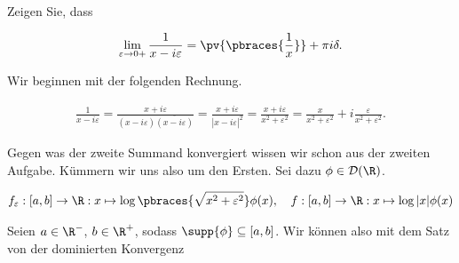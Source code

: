 
\begin{exercise}

Zeigen Sie, dass

\begin{align*}
    \lim_{\varepsilon \to 0+}
    \frac{1}{x - i \varepsilon}
    =
    \pv
    {
        \pbraces
        {
            \frac{1}{x}
        }
    }
    +
    \pi i \delta.
\end{align*}

\end{exercise}


\begin{solution}

Wir beginnen mit der folgenden Rechnung.

\begin{align*}
    \frac{1}{x - i\varepsilon}
    =
    \frac
    {
        x + i \varepsilon
    }{
        (x - i\varepsilon)
        \overline
        {
            (x - i\varepsilon)
        }
    }
    =
    \frac
    {
        x + i \varepsilon
    }{
        |x - i \varepsilon|^2
    }
    =
    \frac{x + i \varepsilon}{x^2 + \varepsilon^2}
    =
    \frac{x}{x^2 + \varepsilon^2} + i\frac{\varepsilon}{x^2 + \varepsilon^2}.
\end{align*}

Gegen was der zweite Summand konvergiert wissen wir schon aus der zweiten Aufgabe.
Kümmern wir uns also um den Ersten.
Sei dazu $\phi \in \mathcal{D}(\R)$.

\begin{align*}
    f_\varepsilon:
    [a,b] \to \R:
    x \mapsto \log\pbraces{\sqrt{x^2 + \varepsilon^2}} \phi(x),
    \quad
    f:
    [a,b] \to \R:
    x \mapsto \log{|x|} \phi(x)
\end{align*}

Seien $a \in \R^-$, $b \in \R^+$, sodass $\supp{\phi} \subseteq [a, b]$.
Wir können also mit dem Satz von der dominierten Konvergenz


\end{solution}
